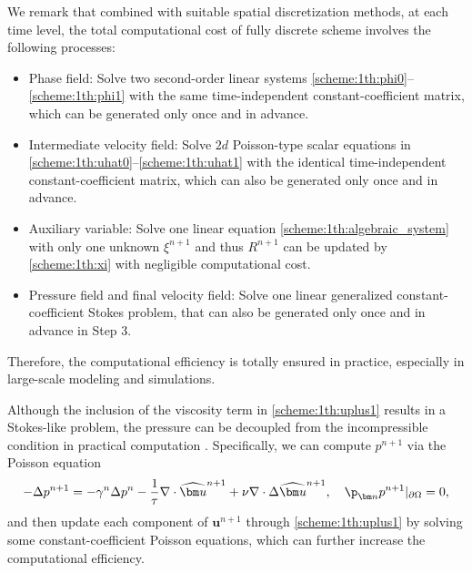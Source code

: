\begin{remark} \label{rem:solve}
	We remark that combined with suitable spatial discretization methods, at each time level, the total computational cost of fully discrete scheme involves the following processes:
	\begin{itemize}
		\item[(i)] Phase field: Solve two second-order linear systems \eqref{scheme:1th:phi0}--\eqref{scheme:1th:phi1} with the same time-independent constant-coefficient matrix, which can be generated only once and in advance.
		
		\item[(ii)]  Intermediate velocity field: Solve $2d$ Poisson-type scalar equations in \eqref{scheme:1th:uhat0}--\eqref{scheme:1th:uhat1} with the identical time-independent constant-coefficient matrix, which can also be generated only once and in advance.
		
		\item[(iii)] Auxiliary variable: Solve one linear equation \eqref{scheme:1th:algebraic_system} with only one unknown $\xi^{n+1}$ and thus $R^{n+1}$ can be updated by \eqref{scheme:1th:xi} with negligible computational cost.
			
		\item[(iv)] Pressure field and final velocity field: Solve one linear generalized constant-coefficient Stokes problem, that can also be generated only once and in advance in Step 3.
	\end{itemize}
	Therefore, the computational efficiency is totally ensured in practice, especially in large-scale modeling and simulations.
\end{remark}

\begin{remark}
	Although the inclusion of the viscosity term in \eqref{scheme:1th:uplus1} results in a Stokes-like problem, the pressure can be decoupled from the incompressible condition in practical computation \cite{Yang2024error}.
	Specifically, we can compute $p^{n+1}$ via the Poisson equation
	\begin{equation*} 
		-\Delta p^{n+1} =-\gamma^n \Delta p^n - \frac{1}{\tau} \nabla \cdot \widehat{\bm u}^{n+1} 
		+ \nu \nabla \cdot \Delta \widehat{\bm u}^{n+1}, \quad  \p_{\bm n} p^{n+1}|_{\partial \Omega}=0,
	\end{equation*} 
	and then update each component of $\bm u^{n+1}$ through \eqref{scheme:1th:uplus1} by solving some constant-coefficient Poisson equations, which can further increase the computational efficiency. 
\end{remark}

